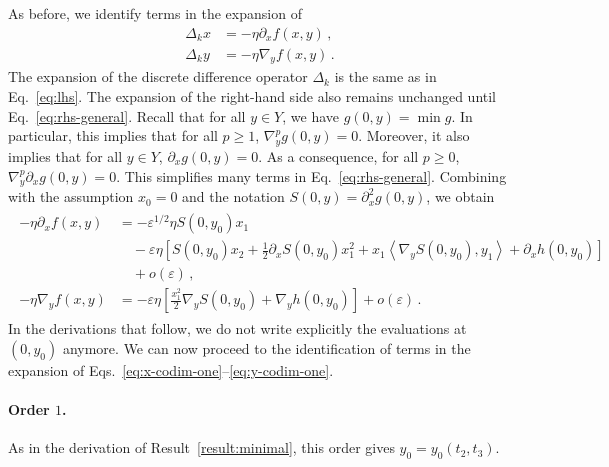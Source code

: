 \documentclass[11pt,english,reqno]{article}
\renewcommand{\geq}{\geqslant}
\theoremstyle{plain}
\theoremstyle{definition}
\theoremstyle{remark}
\numberwithin{equation}{section}
\begin{document}
        As before, we identify terms in the expansion of 
        \begin{align}
            \Delta_k x &= -\eta \partial_x f(x,y) \, , \label{eq:x-codim-one} \\
            \Delta_k y &= -\eta \nabla_y f(x,y) \, . \label{eq:y-codim-one}
        \end{align}
        The expansion of the discrete difference operator $\Delta_k$ is the same as in Eq.~\eqref{eq:lhs}. The expansion of the right-hand side also remains unchanged until Eq.~\eqref{eq:rhs-general}. Recall that for all $y \in Y$, we have $g(0,y) = \min g$. In particular, this implies that for all $p \geq 1$, $\nabla_y^p g(0,y) = 0$. Moreover, it also implies that for all $y \in Y$, $\partial_x g(0,y) = 0$. As a consequence, for all $p \geq 0$, $\nabla_y^p \partial_x g(0,y) = 0$. This simplifies many terms in Eq.~\eqref{eq:rhs-general}. Combining with the assumption $x_0 = 0$ and the notation $S(0,y) = \partial^2_{x} g(0,y)$, we obtain
        \begin{align}
            \label{eq:aux-2}
            \begin{split}
            -\eta \partial_x f(x,y) &= - \varepsilon^{1/2} \eta S(0,y_0) x_1 \\
            &\quad- \varepsilon \eta \left[S(0,y_0) x_2 + \frac{1}{2} \partial_x S(0,y_0) x_1^2 + x_1 \left\langle \nabla_y S(0,y_0), y_1 \right\rangle + \partial_x h(0,y_0)\right] \\
            &\quad+ o(\varepsilon) \, , \\
            -\eta \nabla_y f(x,y) &= - \varepsilon \eta \left[\frac{x_1^2}{2}  \nabla_y S(0,y_0) + \nabla_y h(0,y_0)\right] + o(\varepsilon) \, .
            \end{split}
        \end{align}
        In the derivations that follow, we do not write explicitly the evaluations at $(0,y_0)$ anymore. We can now proceed to the identification of terms in the expansion of Eqs.~\eqref{eq:x-codim-one}--\eqref{eq:y-codim-one}.

        \paragraph{Order $1$.}
        As in the derivation of Result~\ref{result:minimal}, this order gives $y_0 = y_0(t_2, t_3)$.
\end{document}
